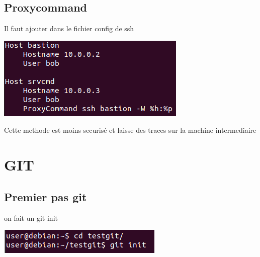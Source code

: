 \documentclass{article}
\begin{document}
 \subsection{\large{Proxycommand}}
  
  Il faut ajouter dans le fichier config de ssh
  
 \begin{center}
        \includegraphics[scale=0.5]{Images/proxycommand.png}
 \end{center}
 
 Cette methode est moins securisé et laisse des traces sur la machine intermediaire 
  
 
  
  \newpage
  
 
 \section{\huge{GIT}}
 
 
 \subsection{\large{Premier pas git}}
 
 on fait un git init
 
 \begin{center}
        \includegraphics[scale=0.5]{Images/gitinit.png}
 \end{center}
 
\end{document}
